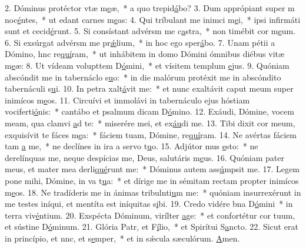 2. Dóminus protéctor vtæ m\uline{e}æ,~* a quo trepid\uline{á}bo?
3. Dum apprópiant super m noc\uline{é}ntes,~* ut edant carnes m\uline{e}as:
4. Qui tríbulant me inimci m\uline{e}i,~* ipsi infirmáti sunt et cecid\uline{é}runt.
5. Si consístant advérsm me c\uline{a}stra,~* non timébit cor m\uline{e}um.
6. Si exsúrgat advérsm me pr\uline{ǽ}lium,~* in hoc ego sper\uline{á}bo.
7. Unam pétii a Dómino, hnc re\uline{quí}ram,~* ut inhábitem in domo Dómini ómnibus diébus vitæ m\uline{e}æ:
8. Ut vídeam volupttem D\uline{ó}mini,~* et vísitem templum \uline{e}jus.
9. Quóniam abscóndit me in tabernáclo s\uline{u}o:~* in die malórum protéxit me in abscóndito tabernáculi s\uline{u}i.
10. In petra xalt\uline{á}vit me:~* et nunc exaltávit caput meum super inimícos m\uline{e}os.
11. Circuívi et immolávi in tabernáculo ejus hóstiam vociferti\uline{ó}nis:~* cantábo et psalmum dicam D\uline{ó}mino.
12. Exáudi, Dómine, vocem meam, qua clamvi \uline{a}d te:~* miserére mei, et ex\uline{áu}di me.
13. Tibi dixit cor meum, exquisívit te fáces m\uline{e}a:~* fáciem tuam, Dómine, re\uline{quí}ram.
14. Ne avértas fáciem tam \uline{a} me,~* ne declínes in ira a servo t\uline{u}o.
15. Adjútor mus \uline{e}sto:~* ne derelínquas me, neque despícias me, Deus, salutáris m\uline{e}us.
16. Quóniam pater meus, et mater mea derli\uline{qué}runt me:~* Dóminus autem ass\uline{ú}mpsit me.
17. Legem pone mihi, Dómine, in va t\uline{u}a:~* et dírige me in sémitam rectam propter inimícos m\uline{e}os.
18. Ne tradíderis me in ánimas tribulnti\uline{u}m me:~* quóniam insurrexérunt in me testes iníqui, et mentíta est iníquitas s\uline{i}bi.
19. Credo vidére bna D\uline{ó}mini~* in terra viv\uline{é}ntium.
20. Exspécta Dóminum, virílter \uline{a}ge:~* et confortétur cor tuum, et sústine D\uline{ó}minum.
21. Glória Patr, et F\uline{í}lio,~* et Spirítui S\uline{a}ncto.
22. Sicut erat in princípio, et nnc, et s\uline{e}mper,~* et in sǽcula sæculórum. \uline{A}men.
